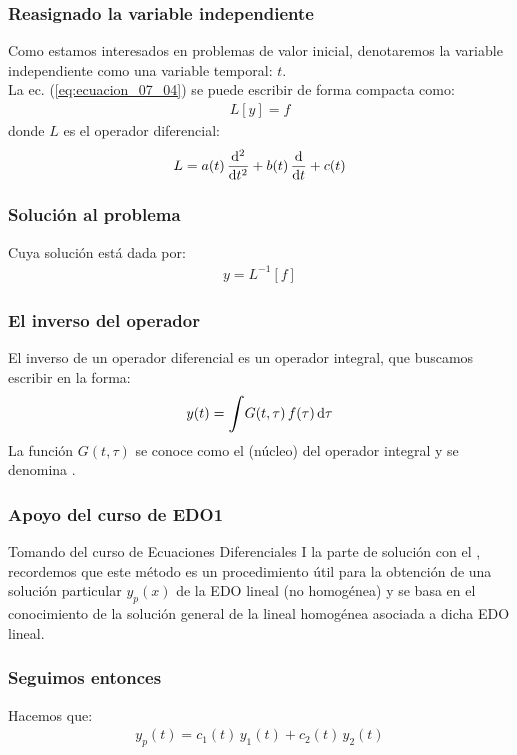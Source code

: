 \documentclass[12pt]{beamer}
\begin{document}
\begin{frame}
\frametitle{Reasignado la variable independiente}
Como estamos interesados en problemas de valor inicial, denotaremos la variable independiente como una variable temporal: $t$.
\\
\bigskip
\pause
La ec. (\ref{eq:ecuacion_07_04}) se puede escribir de forma compacta como:
\pause
\begin{align*}
L [y] = f
\end{align*}
\pause
donde $L$ es el operador diferencial:
\begin{align*}
L = a (t) \, \dv[2]{t} + b (t) \, \dv{t} + c (t) 
\end{align*}
\end{frame}

\begin{frame}
\frametitle{Solución al problema}
Cuya solución está dada por:
\pause
\begin{align*}
y = L^{-1} [f]
\end{align*}
\end{frame}

\begin{frame}
\frametitle{El inverso del operador}
El inverso de un operador diferencial es un operador integral, que buscamos escribir en la forma:
\pause
\begin{align*}
y (t) = \scaleint{6ex} G (t, \tau) \, f(\tau) \dd{\tau}
\end{align*}
\pause
La función $G (t, \tau)$ se conoce como el   (núcleo) del operador integral y  se denomina .
\end{frame}

\begin{frame}
\frametitle{Apoyo del curso de EDO1}
Tomando del curso de Ecuaciones Diferenciales I la parte de solución con el , \pause recordemos que este método es un procedimiento útil para la obtención de una solución particular $y_{p} (x)$ de la EDO lineal (no homogénea) y se basa en el conocimiento de la solución general de la lineal homogénea asociada a dicha EDO lineal.
\end{frame}

\begin{frame}
\frametitle{Seguimos entonces}
Hacemos que:
\pause
\begin{align}
y_{p} (t) = c_{1} (t) \, y_{1} (t) + c_{2} (t) \, y_{2} (t)
\label{eq:ecuacion_07_05}
\end{align}
\end{frame}
\end{document}

